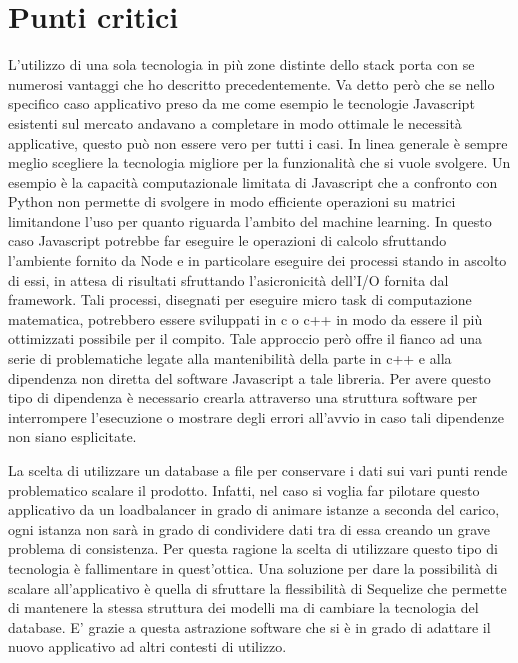 \section{Punti critici}
\vspace{5mm}L'utilizzo di una sola tecnologia in più zone distinte dello stack porta con se numerosi vantaggi che ho descritto precedentemente. Va detto però che se nello specifico caso applicativo preso da me come esempio le tecnologie Javascript esistenti sul mercato andavano a completare in modo ottimale le necessità applicative, questo può non essere vero per tutti i casi. In linea generale è sempre meglio scegliere la tecnologia migliore per la funzionalità che si vuole svolgere. Un esempio è la capacità computazionale limitata di Javascript che a confronto con Python non permette di svolgere in modo efficiente operazioni su matrici limitandone l'uso per quanto riguarda l'ambito del machine learning. In questo caso Javascript potrebbe far eseguire le operazioni di calcolo sfruttando l'ambiente fornito da Node e in particolare eseguire dei processi stando in ascolto di essi, in attesa di risultati sfruttando l'asicronicità dell'I/O fornita dal framework. Tali processi, disegnati per eseguire micro task di computazione matematica, potrebbero essere sviluppati in c o c++ in modo da essere il più ottimizzati possibile per il compito. Tale approccio però offre il fianco ad una serie di problematiche legate alla mantenibilità della parte in c++ e alla dipendenza non diretta del software Javascript a tale libreria. Per avere questo tipo di dipendenza è necessario crearla attraverso una struttura software per interrompere l'esecuzione o mostrare degli errori all'avvio in caso tali dipendenze non siano esplicitate.

\vspace{5mm}La scelta di utilizzare un database a file per conservare i dati sui vari punti rende problematico scalare il prodotto. Infatti, nel caso si voglia far pilotare questo applicativo da un loadbalancer\cite{LoadBalancing} in grado di animare istanze a seconda del carico, ogni istanza non sarà in grado di condividere dati tra di essa creando un grave problema di consistenza. Per questa ragione la scelta di utilizzare questo tipo di tecnologia è fallimentare in quest'ottica. Una soluzione per dare la possibilità di scalare all'applicativo è quella di sfruttare la flessibilità di Sequelize\cite{Sequelize} che permette di mantenere la stessa struttura dei modelli ma di cambiare la tecnologia del database. E' grazie a questa astrazione software che si è in grado di adattare il nuovo applicativo ad altri contesti di utilizzo.









